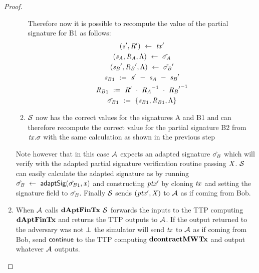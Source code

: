 \begin{proof}
\begin{enumerate}
\begin{enumerate}
            Therefore now it is possible to recompute the value of the partial signature for B1 as follows:
            \begin{gather*}
                ({\mathit{s}}', {\mathit{R}}') ~\leftarrow~ {\mathit{tx}}' \\
                (\mathit{s}_{\mathit{A}}, \mathit{R}_{\mathit{A}}, \Lambda) ~\leftarrow~ \tilde{\sigma_{\mathit{A}}} \\
                ({\mathit{s}_{\mathit{B}}}', {\mathit{R}_{\mathit{B}}}', \Lambda) ~\leftarrow~ {\tilde{\sigma_{\mathit{B}}}}' \\
                {\mathit{s}_{\mathit{B}}}_1 ~:=~ {\mathit{s}}' ~-~ \mathit{s}_{\mathit{A}} ~-~ {\mathit{s}_{\mathit{B}}}' \\
                {\mathit{R}_{\mathit{B}}}_1 ~:=~ {\mathit{R}}' ~\cdot~ {\mathit{R}_{\mathit{A}}}^{-1} ~\cdot~ {{\mathit{R}_{\mathit{B}}}'}^{-1} \\
                {\tilde{\sigma_{\mathit{B}}}}_1 ~:=~ \{ {\mathit{s}_{\mathit{B}}}_1, {\mathit{R}_{\mathit{B}}}_1, \Lambda \}
            \end{gather*}
            \item $\mathcal{S}$ now has the correct values for the signatures A and B1 and can therefore recompute the correct value for the partial signature B2 from $\mathit{tx}.\sigma$ with the same calculation as shown in the previous step
        \end{enumerate}
        Note however that in this case $\mathcal{A}$ expects an adapted signature $\hat{\sigma_{\mathit{B}}}$ which will verify with the adapted partial signature verification routine passing $\mathit{X}$.
        $\mathcal{S}$ can easily calculate the adapted signature as by running $\hat{\sigma_{\mathit{B}}} ~\leftarrow~ \mathsf{adaptSig}({\tilde{\sigma_{\mathit{B}}}_1}, \mathit{x})$ and constructing ${\mathit{ptx}}'$ by cloning $\mathit{tx}$ and setting the signature field to $\hat{\sigma_{\mathit{B}}}$.
        Finally $\mathcal{S}$ sends $({\mathit{ptx}}',\mathit{X})$ to $\mathcal{A}$ as if coming from Bob.
        \item When $\mathcal{A}$ calls $\mathbf{dAptFinTx}$ $\mathcal{S}$ forwards the inputs to the TTP computing $\mathbf{dAptFinTx}$ and returns the TTP outputs to $\mathcal{A}$.
        If the output returned to the adversary was not $\bot$ the simulator will send $\mathit{tx}$ to $\mathcal{A}$ as if coming from Bob, send $\mathsf{continue}$ to the TTP computing $\mathbf{dcontractMWTx}$ and output whatever $\mathcal{A}$ outputs.
    \end{enumerate}


\end{proof}
